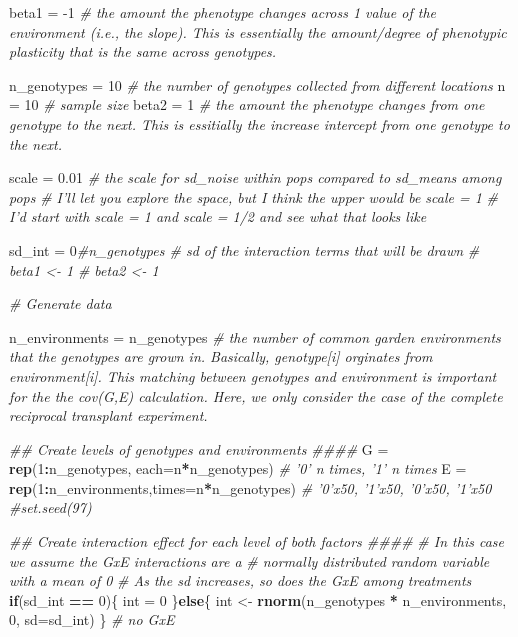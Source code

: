 \documentclass[]{article}
\newenvironment{Shaded}{\begin{snugshade}}{\end{snugshade}}
\newcommand{\CommentTok}[1]{\textcolor[rgb]{0.56,0.35,0.01}{\textit{#1}}}
\newcommand{\ControlFlowTok}[1]{\textcolor[rgb]{0.13,0.29,0.53}{\textbf{#1}}}
\newcommand{\DataTypeTok}[1]{\textcolor[rgb]{0.13,0.29,0.53}{#1}}
\newcommand{\DecValTok}[1]{\textcolor[rgb]{0.00,0.00,0.81}{#1}}
\newcommand{\FloatTok}[1]{\textcolor[rgb]{0.00,0.00,0.81}{#1}}
\newcommand{\KeywordTok}[1]{\textcolor[rgb]{0.13,0.29,0.53}{\textbf{#1}}}
\newcommand{\NormalTok}[1]{#1}
\newcommand{\OperatorTok}[1]{\textcolor[rgb]{0.81,0.36,0.00}{\textbf{#1}}}
\newcommand{\StringTok}[1]{\textcolor[rgb]{0.31,0.60,0.02}{#1}}
\begin{document}
\begin{Shaded}
\begin{Highlighting}[]
\NormalTok{beta1 =}\StringTok{ }\DecValTok{-1} \CommentTok{# the amount the phenotype changes across 1 value of the environment (i.e., the slope). This is essentially the amount/degree of phenotypic plasticity that is the same across genotypes.}

\NormalTok{n_genotypes =}\StringTok{ }\DecValTok{10} \CommentTok{# the number of genotypes collected from different locations}
\NormalTok{n =}\StringTok{ }\DecValTok{10} \CommentTok{# sample size}
\NormalTok{beta2 =}\StringTok{ }\DecValTok{1} \CommentTok{# the amount the phenotype changes from one genotype to the next. This is essitially the increase intercept from one genotype to the next.}

\NormalTok{scale =}\StringTok{ }\FloatTok{0.01} \CommentTok{# the scale for sd_noise within pops compared to sd_means among pops}
\CommentTok{# I'll let you explore the space, but I think the upper would be scale = 1}
\CommentTok{# I'd start with scale = 1 and scale = 1/2 and see what that looks like}

\NormalTok{sd_int =}\StringTok{ }\DecValTok{0}\CommentTok{#n_genotypes # sd of the interaction terms that will be drawn}
    \CommentTok{#  beta1 <- 1}
    \CommentTok{#  beta2 <- 1}
    
    \CommentTok{# Generate data}
    
\NormalTok{    n_environments =}\StringTok{ }\NormalTok{n_genotypes }\CommentTok{# the number of common garden environments that the genotypes are grown in. Basically, genotype[i] orginates from environment[i]. This matching between genotypes and environment is important for the the cov(G,E) calculation. Here, we only consider the case of the complete reciprocal transplant experiment.}

    \CommentTok{## Create levels of genotypes and environments ####}
\NormalTok{    G =}\StringTok{ }\KeywordTok{rep}\NormalTok{(}\DecValTok{1}\OperatorTok{:}\NormalTok{n_genotypes, }\DataTypeTok{each=}\NormalTok{n}\OperatorTok{*}\NormalTok{n_genotypes) }\CommentTok{# '0' n times, '1' n times}
\NormalTok{    E =}\StringTok{ }\KeywordTok{rep}\NormalTok{(}\DecValTok{1}\OperatorTok{:}\NormalTok{n_environments,}\DataTypeTok{times=}\NormalTok{n}\OperatorTok{*}\NormalTok{n_genotypes) }\CommentTok{# '0'x50, '1'x50, '0'x50, '1'x50}
    \CommentTok{#set.seed(97)}
    

    \CommentTok{## Create interaction effect for each level of both factors ####}
    \CommentTok{# In this case we assume the GxE interactions are a }
    \CommentTok{# normally distributed random variable with a mean of 0}
    \CommentTok{# As the sd increases, so does the GxE among treatments}
    \ControlFlowTok{if}\NormalTok{(sd_int }\OperatorTok{==}\StringTok{ }\DecValTok{0}\NormalTok{)\{}
\NormalTok{      int =}\StringTok{ }\DecValTok{0}
\NormalTok{    \}}\ControlFlowTok{else}\NormalTok{\{}
\NormalTok{    int <-}\StringTok{ }\KeywordTok{rnorm}\NormalTok{(n_genotypes }\OperatorTok{*}\StringTok{ }\NormalTok{n_environments, }\DecValTok{0}\NormalTok{, }\DataTypeTok{sd=}\NormalTok{sd_int)}
\NormalTok{    \}}
    \CommentTok{# no GxE}
 

\end{Highlighting}
\end{Shaded}
\end{document}
